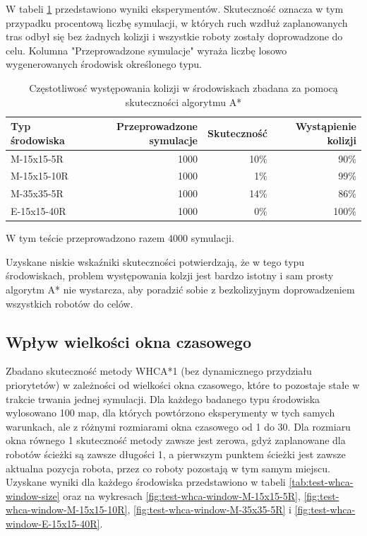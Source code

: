 W tabeli \ref{tab:test-collision-frequency} przedstawiono wyniki eksperymentów. Skuteczność oznacza w tym przypadku procentową liczbę symulacji, w których ruch wzdłuż zaplanowanych tras odbył się bez żadnych kolizji i wszystkie roboty zostały doprowadzone do celu.
Kolumna "Przeprowadzone symulacje" wyraża liczbę losowo wygenerowanych środowisk określonego typu.

\begin{table}
\caption{Częstotliwosć występowania kolizji w środowiskach zbadana za pomocą skuteczności algorytmu A*}
\label{tab:test-collision-frequency}
\centering
\begin{tabular}{| l | r | r | r |}
\hline
{\bf Typ środowiska} & {\bf Przeprowadzone symulacje} & {\bf Skuteczność} & {\bf Wystąpienie kolizji} \\ \hline
M-15x15-5R  & 1000 & 10\% & 90\% \\ \hline
M-15x15-10R & 1000 & 1\%  & 99\%  \\ \hline
M-35x35-5R  & 1000 & 14\% & 86\% \\ \hline
E-15x15-40R & 1000 & 0\%  & 100\%  \\ \hline
\end{tabular}
\end{table}

W tym teście przeprowadzono razem $4000$ symulacji.

Uzyskane niskie wskaźniki skuteczności potwierdzają, że w tego typu środowiskach, problem występowania kolzji jest bardzo istotny i sam prosty algorytm A* nie wystarcza, aby poradzić sobie z bezkolizyjnym doprowadzeniem wszystkich robotów do celów.

\subsection{Wpływ wielkości okna czasowego} %
Zbadano skuteczność metody WHCA*1 (bez dynamicznego przydziału priorytetów) w zależności od wielkości okna czasowego, które to pozostaje stałe w trakcie trwania jednej symulacji.
Dla każdego badanego typu środowiska wylosowano 100 map, dla których powtórzono eksperymenty w tych samych warunkach, ale z różnymi rozmiarami okna czasowego od 1 do 30.
Dla rozmiaru okna równego 1 skuteczność metody zawsze jest zerowa, gdyż zaplanowane dla robotów ścieżki są zawsze długości 1, a pierwszym punktem ścieżki jest zawsze aktualna pozycja robota, przez co roboty pozostają w tym samym miejscu.
Uzyskane wyniki dla każdego środowiska przedstawiono w tabeli \ref{tab:test-whca-window-size} oraz na wykresach \ref{fig:test-whca-window-M-15x15-5R}, \ref{fig:test-whca-window-M-15x15-10R}, \ref{fig:test-whca-window-M-35x35-5R} i \ref{fig:test-whca-window-E-15x15-40R}.

